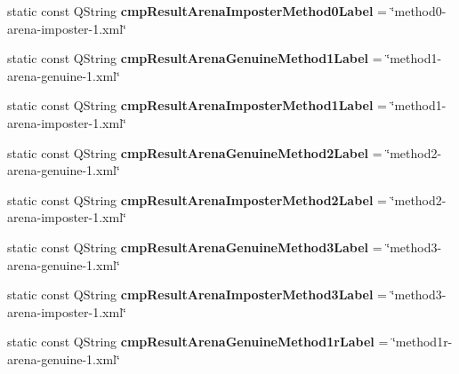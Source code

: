\begin{DoxyCompactItemize}
\item 
\hypertarget{class_common_aabd0f0d3065de618f747577b34da1a18}{static const Q\+String {\bfseries cmp\+Result\+Arena\+Imposter\+Method0\+Label} = \char`\"{}method0-\/arena-\/imposter-\/1.xml\char`\"{}}\label{class_common_aabd0f0d3065de618f747577b34da1a18}

\item 
\hypertarget{class_common_a42aa9f14c40e3ceef78864375c9e0cd5}{static const Q\+String {\bfseries cmp\+Result\+Arena\+Genuine\+Method1\+Label} = \char`\"{}method1-\/arena-\/genuine-\/1.xml\char`\"{}}\label{class_common_a42aa9f14c40e3ceef78864375c9e0cd5}

\item 
\hypertarget{class_common_aa8bf3b464836cbdcbd2ea6eda1ec02cd}{static const Q\+String {\bfseries cmp\+Result\+Arena\+Imposter\+Method1\+Label} = \char`\"{}method1-\/arena-\/imposter-\/1.xml\char`\"{}}\label{class_common_aa8bf3b464836cbdcbd2ea6eda1ec02cd}

\item 
\hypertarget{class_common_a96b8dd134cfb1b6372f208d39242d4d6}{static const Q\+String {\bfseries cmp\+Result\+Arena\+Genuine\+Method2\+Label} = \char`\"{}method2-\/arena-\/genuine-\/1.xml\char`\"{}}\label{class_common_a96b8dd134cfb1b6372f208d39242d4d6}

\item 
\hypertarget{class_common_a960d8c60d4ab6645e22b54005ac1b067}{static const Q\+String {\bfseries cmp\+Result\+Arena\+Imposter\+Method2\+Label} = \char`\"{}method2-\/arena-\/imposter-\/1.xml\char`\"{}}\label{class_common_a960d8c60d4ab6645e22b54005ac1b067}

\item 
\hypertarget{class_common_aa95a604ffbd5e7faf4bc732e4d02f136}{static const Q\+String {\bfseries cmp\+Result\+Arena\+Genuine\+Method3\+Label} = \char`\"{}method3-\/arena-\/genuine-\/1.xml\char`\"{}}\label{class_common_aa95a604ffbd5e7faf4bc732e4d02f136}

\item 
\hypertarget{class_common_a18a9334d43639685e57fffc495e95eb4}{static const Q\+String {\bfseries cmp\+Result\+Arena\+Imposter\+Method3\+Label} = \char`\"{}method3-\/arena-\/imposter-\/1.xml\char`\"{}}\label{class_common_a18a9334d43639685e57fffc495e95eb4}

\item 
\hypertarget{class_common_a4db686ec49ce1d693a377c09f136a644}{static const Q\+String {\bfseries cmp\+Result\+Arena\+Genuine\+Method1r\+Label} = \char`\"{}method1r-\/arena-\/genuine-\/1.xml\char`\"{}}\label{class_common_a4db686ec49ce1d693a377c09f136a644}


\end{DoxyCompactItemize}

